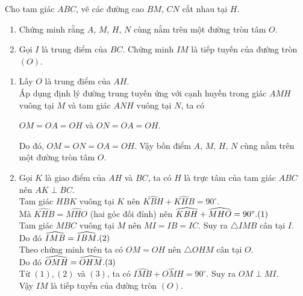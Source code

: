 \begin{vd}
Cho tam giác $ABC$, vẽ các đường cao $BM$, $CN$ cắt nhau tại $H$.
\begin{enumerate}
\item Chứng minh rằng $A$, $M$, $H$, $N$ cùng nằm trên một đường tròn tâm $O$.
\item Gọi $I$ là trung điểm của $BC$. Chứng minh $IM$ là tiếp tuyến của đường tròn $(O)$.
\end{enumerate}
\loigiai
{
\begin{center}
\end{center}
\begin{enumerate}
\item Lấy $O$ là trung điểm của $AH$.\\
Áp dụng định lý đường trung tuyến ứng với cạnh huyền trong giác $AMH$ vuông tại $M$ và tam giác $ANH$ vuông tại $N$, ta có
\begin{center}
$OM=OA=OH$ và $ON=OA=OH$.
\end{center}
Do đó, $OM=ON=OA=OH$. Vậy bốn điểm $A$, $M$, $H$, $N$ cùng nằm trên một đường tròn tâm $O$.
\item Gọi $K$ là giao điểm của $AH$ và $BC$, ta có $H$ là trực tâm của tam giác $ABC$ nên $AK \perp BC.$\\
Tam giác $HBK$ vuông tại $K$ nên $\widehat{KBH}+\widehat{KHB}=90^{\circ}.$\\
Mà $\widehat{KHB}=\widehat{MHO}$ (hai góc đối đỉnh) nên $\widehat{KBH}+\widehat{MHO}=90^{\circ}. \hfill(1)$\\
Tam giác $MBC$ vuông tại $M$ nên $MI=IB=IC$. Suy ra $\triangle IMB$ cân tại $I$.\\
Do đó $\widehat{IMB}=\widehat{IBM}. \hfill(2)$\\
Theo chứng minh trên ta có $OM=OH$ nên $\triangle OHM$ cân tại $O$.\\
Do đó $\widehat{OMH}=\widehat{OHM}. \hfill(3)$\\
Từ $(1),(2)$ và $(3)$, ta có $\widehat{IMB}+\widehat{OMH}=90^{\circ}.$ Suy ra $OM \perp MI.$\\
Vậy $IM$ là tiếp tuyến của đường tròn $(O)$.
\end{enumerate}
}
\end{vd}

